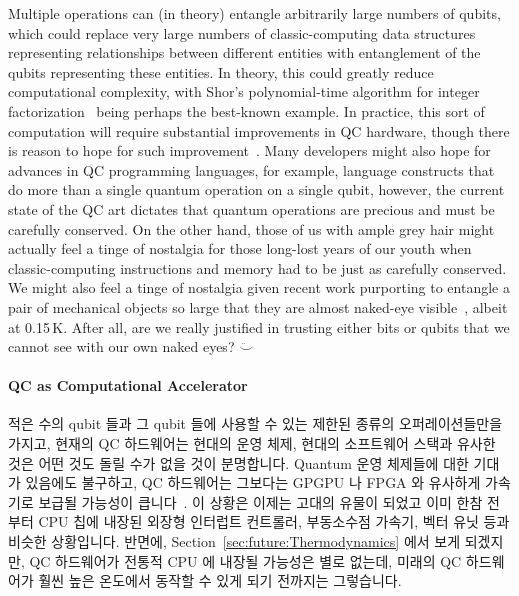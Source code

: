 Multiple  operations can (in theory) entangle arbitrarily
large numbers of qubits, which could replace very large numbers of
classic-computing data structures representing relationships between
different entities with entanglement of the qubits
representing these entities.
In theory, this could greatly reduce computational complexity, with
Shor's polynomial-time algorithm for integer
factorization~\cite{Shor:1997:PAP:264393.264406}
being perhaps the best-known example.
In practice, this sort of computation will require substantial
improvements in QC hardware, though there is reason to hope
for such improvement~\cite{RobertMcConnell2015QC-Entangle3000Atoms}.
Many developers might also hope for advances in QC programming languages,
for example, language constructs that do more than a single quantum
operation on a single qubit, however, the current state of the
QC art dictates that quantum operations are precious and must
be carefully conserved.
On the other hand, those of us with ample grey hair might actually
feel a tinge of nostalgia for those long-lost years of our youth when
classic-computing instructions and memory had to be just as carefully
conserved.
\fi
We might also feel a tinge of nostalgia given recent work purporting
to entangle a pair of mechanical objects so large that they are almost
naked-eye visible~\cite{CFOckeloen-Korppi2017MassiveEntanglement},
albeit at 0.15\,K.
After all, are we really justified in trusting either bits or qubits
that we cannot see with our own naked eyes?  $\ddot\smile$

\paragraph{QC as Computational Accelerator}

적은 수의 qubit 들과 그 qubit 들에 사용할 수 있는 제한된 종류의
오퍼레이션들만을 가지고, 현재의 QC 하드웨어는 현대의 운영 체제, 현대의
소프트웨어 스택과 유사한 것은 어떤 것도 돌릴 수가 없을 것이 분명합니다.
Quantum 운영 체제들에 대한 기대가 있음에도 불구하고, QC 하드웨어는 그보다는
GPGPU 나 FPGA 와 유사하게 가속기로 보급될 가능성이
큽니다~\cite{HenryCorriganGibbs2017QCOS}.
이 상황은 이제는 고대의 유물이 되었고 이미 한참 전부터 CPU 칩에 내장된 외장형
인터럽트 컨트롤러, 부동소수점 가속기, 벡터 유닛 등과 비슷한 상황입니다.
반면에, Section~\ref{sec:future:Thermodynamics} 에서 보게 되겠지만, QC
하드웨어가 전통적 CPU 에 내장될 가능성은 별로 없는데, 미래의 QC 하드웨어가 훨씬
높은 온도에서 동작할 수 있게 되기 전까지는 그렇습니다.
\iffalse

